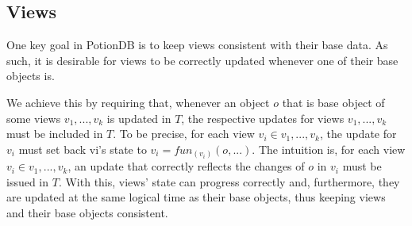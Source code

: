 \documentclass[sigconf, nonacm]{acmart}
\begin{document}
%
%

\subsection{Views}
\label{subsec:viewsTransaction}

One key goal in PotionDB is to keep views consistent with their base data.
As such, it is desirable for views to be correctly updated whenever one of their base objects is.

We achieve this by requiring that, whenever an object $o$ that is base object of some views $v_1, ..., v_k$ is updated in $T$, the respective updates for views $v_1, ..., v_k$ must be included in $T$.
To be precise, for each view $v_i \in v_1, ..., v_k$, the update for $v_i$ must set back vi’s state to $v_i = fun_{(v_i)}(o, ...)$.
The intuition is, for each view $v_i \in v_1, ..., v_k$, an update that correctly reflects the changes of $o$ in $v_i$ must be issued in $T$.
With this, views' state can progress correctly and, furthermore, they are updated at the same logical time as their base objects, thus keeping views and their base objects consistent.
\end{document}
